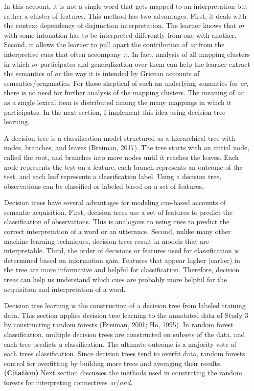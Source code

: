 \documentclass[,man,floatsintext]{apa6}
\begin{document}
In this account, it is not a single word that gets mapped to an interpretation but rather a cluster of features. This method has two advantages. First, it deals with the context dependency of disjunction interpretation. The learner knows that \emph{or} with some intonation has to be interpreted differently from one with another. Second, it allows the learner to pull apart the contribution of \emph{or} from the interpretive cues that often accompany it. In fact, analysis of all mapping clusters in which \emph{or} participates and generalization over them can help the learner extract the semantics of \emph{or} the way it is intended by Gricean accounts of semantics/pragmatics. For those skeptical of such an underlying semantics for \emph{or}, there is no need for further analysis of the mapping clusters. The meaning of \emph{or} as a single lexical item is distributed among the many mappings in which it participates. In the next section, I implement this idea using decision tree learning.

A decision tree is a classification model structured as a hierarchical tree with nodes, branches, and leaves (Breiman, 2017). The tree starts with an initial node, called the root, and branches into more nodes until it reaches the leaves. Each node represents the test on a feature, each branch represents an outcome of the test, and each leaf represents a classification label. Using a decision tree, observations can be classified or labeled based on a set of features.

Decision trees have several advantages for modeling cue-based accounts of semantic acquisition. First, decision trees use a set of features to predict the classification of observations. This is analogous to using cues to predict the correct interpretation of a word or an utterance. Second, unlike many other machine learning techniques, decision trees result in models that are interpretable. Third, the order of decisions or features used for classification is determined based on information gain. Features that appear higher (earlier) in the tree are more informative and helpful for classification. Therefore, decision trees can help us understand which cues are probably more helpful for the acquisition and interpretation of a word.

Decision tree learning is the construction of a decision tree from labeled training data. This section applies decision tree learning to the annotated data of Study 3 by constructing random forests (Breiman, 2001; Ho, 1995). In random forest classification, multiple decision trees are constructed on subsets of the data, and each tree predicts a classification. The ultimate outcome is a majority vote of each trees classification. Since decision trees tend to overfit data, random forests control for overfitting by building more trees and averaging their results. \textbf{(Citation)} Next section discusses the methods used in constrcting the random forests for interpreting connectives \emph{or}/\emph{and}.
\end{document}
